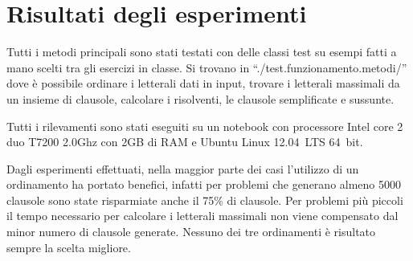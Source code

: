 \documentclass[a4paper,11pt]{article} %
\newcommand{\sintassi}{\texttt}
\newcommand{\classe}{\textsf}
\begin{document}











\section{Risultati degli esperimenti}\label{sec: esperimenti}
Tutti i metodi principali sono stati testati con delle classi test
su esempi fatti a mano scelti tra gli esercizi in classe. Si trovano
in ``./test.funzionamento.metodi/'' dove è possibile ordinare i letterali
dati in input, trovare i letterali massimali da un insieme di clausole,
calcolare i risolventi, le clausole semplificate e sussunte.

Tutti i rilevamenti sono stati eseguiti su un notebook con processore 
\textsf{Intel core 2 duo T7200 2.0Ghz} con 2GB di RAM e Ubuntu Linux 
12.04~LTS 64~bit.

Dagli esperimenti effettuati, nella maggior parte dei casi l'utilizzo
di un ordinamento ha portato benefici, %
infatti
per problemi che generano almeno 5000 clausole
sono state risparmiate anche il 75\% di clausole. %
Per problemi più piccoli il tempo necessario per calcolare i letterali 
massimali non viene compensato dal minor numero di clausole generate.
Nessuno dei tre ordinamenti è risultato sempre la scelta migliore.
\end{document}
